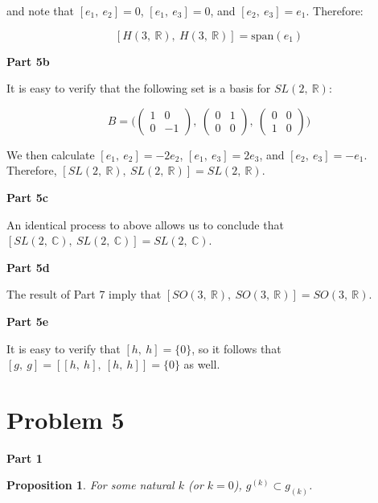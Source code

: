 \documentclass[10pt, oneside]{article}
\newtheorem{prop}{Proposition}
\begin{document}
    and note that $[e_1, \ e_2] = 0$, $[e_1, \ e_3] = 0$, and $[e_2, \ e_3] = e_1$. Therefore:

    $$[H(3, \ \mathbb{R}), \ H(3, \ \mathbb{R})] = \text{span}(e_1)$$

    \textbf{Part 5b}
    \newline

    It is easy to verify that the following set is a basis for $SL(2, \ \mathbb{R})$:

    $$B = \Bigg( \begin{pmatrix} 1 & 0 \\ 0 & -1 \end{pmatrix}, \ \begin{pmatrix} 0 & 1 \\ 0 & 0 \end{pmatrix}, \ \begin{pmatrix} 0 & 0 \\ 1 & 0 \end{pmatrix} \Bigg)$$

    We then calculate $[e_1, \ e_2] = -2e_2$, $[e_1, \ e_3] = 2e_3$, and $[e_2, \ e_3] = -e_1$. Therefore, $[SL(2, \ \mathbb{R}), \ SL(2, \ \mathbb{R})] = SL(2, \ \mathbb{R})$.
    \newline

    \textbf{Part 5c}
    \newline

    An identical process to above allows us to conclude that $[SL(2, \ \mathbb{C}), \ SL(2, \ \mathbb{C})] = SL(2, \ \mathbb{C})$.
    \newline

    \textbf{Part 5d}
    \newline

    The result of Part 7 imply that $[SO(3, \ \mathbb{R}), \ SO(3, \ \mathbb{R})] = SO(3, \ \mathbb{R})$.
    \newline

    \textbf{Part 5e}
    \newline

    It is easy to verify that $[h, \ h] = \{0\}$, so it follows that $[g, \ g] = [[h, \ h], \ [h, \ h]] = \{0\}$ as well.

    \section{Problem 5}

    \textbf{Part 1}

    \begin{prop}
      For some natural $k$ (or $k = 0$), $g^{(k)} \subset g_{(k)}$.
    \end{prop}
\end{document}
